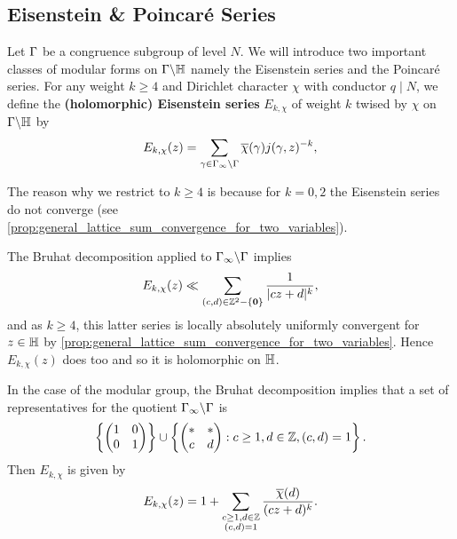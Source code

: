     \subsection*{Eisenstein \& Poincar\'e Series}
      Let $\Gamma$ be a congruence subgroup of level $N$. We will introduce two important classes of modular forms on $\Gamma\backslash\mathbb{H}$ namely the Eisenstein series and the Poincar\'e series. For any weight $k \ge 4$ and Dirichlet character $\chi$ with conductor $q \mid N$, we define the \textbf{(holomorphic) Eisenstein series} $E_{k,\chi}$ of weight $k$ twised by $\chi$ on $\Gamma\backslash\mathbb{H}$ by
      \[
        E_{k,\chi}(z) = \sum_{\gamma \in \Gamma_{\infty}\backslash\Gamma}\overline{\chi}(\gamma)j(\gamma,z)^{-k},
      \]

      \begin{remark}
        The reason why we restrict to $k \ge 4$ is because for $k = 0,2$ the Eisenstein series do not converge (see \cref{prop:general_lattice_sum_convergence_for_two_variables}).
      \end{remark}

      The Bruhat decomposition applied to $\Gamma_{\infty}\backslash\Gamma$ implies
      \[
        E_{k,\chi}(z) \ll \sum_{(c,d) \in \mathbb{Z}^{2}-\{\mathbf{0}\}}\frac{1}{|cz+d|^{k}},
      \]
      and as $k \ge 4$, this latter series is locally absolutely uniformly convergent for $z \in \mathbb{H}$ by \cref{prop:general_lattice_sum_convergence_for_two_variables}. Hence $E_{k,\chi}(z)$ does too and so it is holomorphic on $\mathbb{H}$.

      \begin{remark}\label{rem:Eisenstein_series_on_modular_group}
        In the case of the modular group, the Bruhat decomposition implies that a set of representatives for the quotient $\Gamma_{\infty}\backslash\Gamma$ is
      \[
        \left\{\begin{pmatrix} 1 & 0 \\ 0 & 1 \end{pmatrix}\right\} \cup \left\{\begin{pmatrix} \ast & \ast \\ c & d \end{pmatrix}:c \ge 1, d \in \mathbb{Z}, (c,d) = 1\right\}.
      \]
      Then $E_{k,\chi}$ is given by
        \[
          E_{k,\chi}(z) = 1+\sum_{\substack{c \ge 1, d \in \mathbb{Z} \\ (c,d) = 1}}\frac{\overline{\chi}(d)}{(cz+d)^{k}}.
        \]
      \end{remark}

